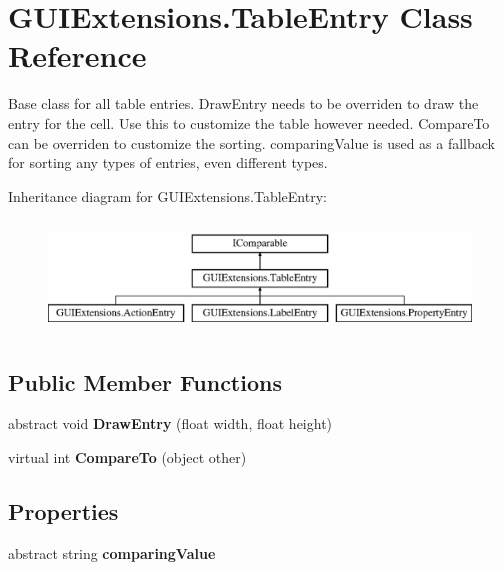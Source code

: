 \hypertarget{class_g_u_i_extensions_1_1_table_entry}{}\section{G\+U\+I\+Extensions.\+Table\+Entry Class Reference}
\label{class_g_u_i_extensions_1_1_table_entry}


Base class for all table entries. Draw\+Entry needs to be overriden to draw the entry for the cell. Use this to customize the table however needed. Compare\+To can be overriden to customize the sorting. comparing\+Value is used as a fallback for sorting any types of entries, even different types.  


Inheritance diagram for G\+U\+I\+Extensions.\+Table\+Entry\+:\begin{figure}[H]
\begin{center}
\leavevmode
\includegraphics[height=3.000000cm]{class_g_u_i_extensions_1_1_table_entry}
\end{center}
\end{figure}
\subsection*{Public Member Functions}
\begin{DoxyCompactItemize}
\item 
\mbox{\label{class_g_u_i_extensions_1_1_table_entry_a016546c12c86e693840a15b74a775bb0}} 
abstract void {\bfseries Draw\+Entry} (float width, float height)
\item 
\mbox{\label{class_g_u_i_extensions_1_1_table_entry_a9d148f0b0dd7c1b08ce1d38378164798}} 
virtual int {\bfseries Compare\+To} (object other)
\end{DoxyCompactItemize}
\subsection*{Properties}
\begin{DoxyCompactItemize}
\item 
\mbox{\label{class_g_u_i_extensions_1_1_table_entry_a75a4c1aab5335e83969f4e04f6fbb83c}} 
abstract string {\bfseries comparing\+Value}
\end{DoxyCompactItemize}


